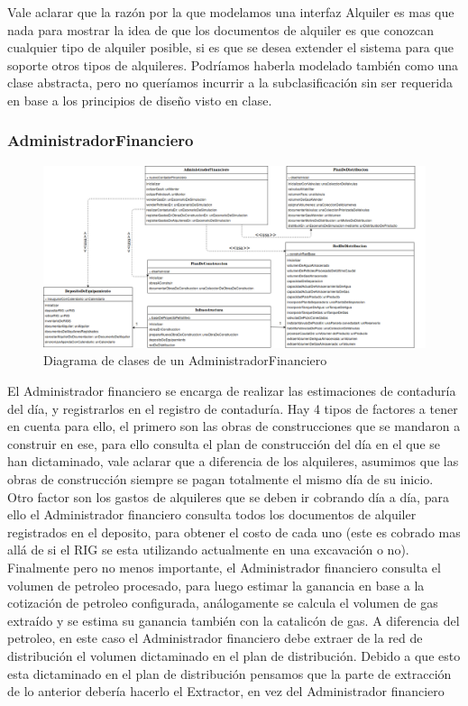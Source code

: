 \documentclass[10pt,a4paper]{article}
\begin{document}
Vale aclarar que la razón por la que modelamos una interfaz Alquiler es mas que nada para mostrar la idea de que los documentos de alquiler es que conozcan cualquier tipo de alquiler posible, si es que se desea extender el sistema para que soporte otros tipos de alquileres. Podríamos haberla modelado también como una clase abstracta, pero no queríamos incurrir a la subclasificación sin ser requerida en base a los principios de diseño visto en clase.


\subsubsection{AdministradorFinanciero}

\begin{figure}[H]
\centerline{\includegraphics[scale=0.38]{images/DiagramaDeClases_deAdministradorFinanciero.png}}
\caption{Diagrama de clases de un AdministradorFinanciero}
\end{figure}

El Administrador financiero se encarga de realizar las estimaciones de contaduría del día, y registrarlos en el registro de contaduría. Hay 4 tipos de factores a tener en cuenta para ello, el primero son las obras de construcciones que se mandaron a construir en ese, para ello consulta el plan de construcción del día en el que se han dictaminado, vale aclarar que a diferencia de los alquileres, asumimos que las obras de construcción siempre se pagan totalmente el mismo día de su inicio. Otro factor son los gastos de alquileres que se deben ir cobrando día a día, para ello el Administrador financiero consulta todos los documentos de alquiler registrados en el deposito, para obtener el costo de cada uno (este es cobrado mas allá de si el RIG se esta utilizando actualmente en una excavación o no). Finalmente pero no menos importante, el Administrador financiero consulta el volumen de petroleo procesado, para luego estimar la ganancia en base a la cotización de petroleo configurada, análogamente se calcula el volumen de gas extraído y se estima su ganancia también con la catalicón de gas. A diferencia del petroleo, en este caso el Administrador financiero debe extraer de la red de distribución el volumen dictaminado en el plan de distribución. Debido a que esto esta dictaminado en el plan de distribución pensamos que la parte de extracción de lo anterior debería hacerlo el Extractor, en vez del Administrador financiero 
\end{document}
